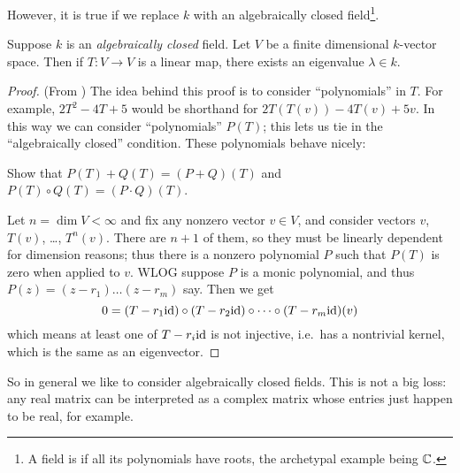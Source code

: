 However, it is true if we replace $k$ with an
algebraically closed field\footnote{A field is 
	if all its polynomials have roots,
	the archetypal example being $\mathbb C$.}.
\begin{theorem}
	Suppose $k$ is an \emph{algebraically closed} field.
	Let $V$ be a finite dimensional $k$-vector space.
	Then if $T \colon V \to V$ is a linear map,
	there exists an eigenvalue $\lambda \in k$.
\end{theorem}
\begin{proof}
	(From \cite{ref:axler})
	The idea behind this proof is to consider ``polynomials'' in $T$.
	For example, $2T^2-4T+5$ would be shorthand for $2T(T(v)) - 4T(v) + 5v$.
	In this way we can consider ``polynomials'' $P(T)$;
	this lets us tie in the ``algebraically closed'' condition.
	These polynomials behave nicely:
	\begin{ques}
		Show that $P(T)+Q(T) = (P+Q)(T)$ and $P(T) \circ Q(T) = (P \cdot Q)(T)$.
	\end{ques}

	Let $n = \dim V < \infty$ and fix any nonzero vector $v \in V$,
	and consider vectors $v$, $T(v)$, \dots, $T^n (v)$.
	There are $n+1$ of them,
	so they must be linearly dependent for dimension reasons;
	thus there is a nonzero polynomial $P$ such that $P(T)$
	is zero when applied to $v$.
	WLOG suppose $P$ is a monic polynomial,
	and thus $P(z) = (z-r_1)\dots(z-r_m)$ say.
	Then we get
	\[ 0 = (T - r_1 \mathrm{id}) \circ (T - r_2 \mathrm{id}) \circ \dots
		\circ (T - r_m \mathrm{id})(v) \]
	which means at least one of $T - r_i \mathrm{id}$ is not injective,
	i.e.\ has a nontrivial kernel,
	which is the same as an eigenvector.
\end{proof}
So in general we like to consider algebraically closed fields.
This is not a big loss:
any real matrix can be interpreted as a complex matrix
whose entries just happen to be real, for example.

